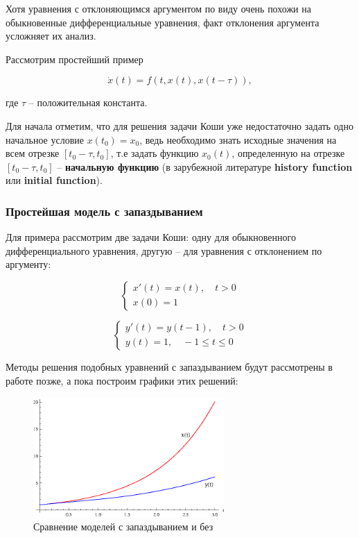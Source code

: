 Хотя уравнения с отклоняющимся аргументом по виду очень похожи на обыкновенные дифференциальные уравнения, факт отклонения аргумента усложняет их анализ.

Рассмотрим простейший пример

\begin{equation}\label{eq:example}
\dot{x}(t) = f(t,x(t),x(t-\tau)),
\end{equation}

где $\tau$ \--- положительная константа.

Для начала отметим, что для решения задачи Коши уже недостаточно задать одно начальное условие $x(t_0)=x_0$, ведь необходимо знать исходные значения на всем отрезке $[t_0-\tau,t_0]$, т.е задать функцию $x_0(t)$, определенную на отрезке $[t_0-\tau,t_0]$ \--- \textbf{начальную функцию} (в зарубежной литературе \textbf{history function} или \textbf{initial function}).

\subsubsection{Простейшая модель с запаздыванием}

Для примера рассмотрим две задачи Коши: одну для обыкновенного дифференциального уравнения, другую \--- для уравнения с отклонением по аргументу:

\begin{equation}\label{eq:no-delay}
\left\{
\begin{aligned}
x'(t) = x(t), \quad t>0\\
x(0) = 1
\end{aligned}
\right.
\end{equation}

\begin{equation}\label{eq:delay}
\left\{
\begin{aligned}
y'(t) = y(t-1), \quad t>0\\
y(t) = 1, \quad -1 \leq t \leq 0
\end{aligned}
\right.
\end{equation}

Методы решения подобных уравнений с запаздыванием будут рассмотрены в работе позже, а пока построим графики этих решений:


\begin{figure}[h]
\begin{center}
\includegraphics[width=0.65\textwidth]{./1_modelling/comparison.eps}
\end{center}
\caption{Сравнение моделей с запаздыванием и без}
\end{figure}

